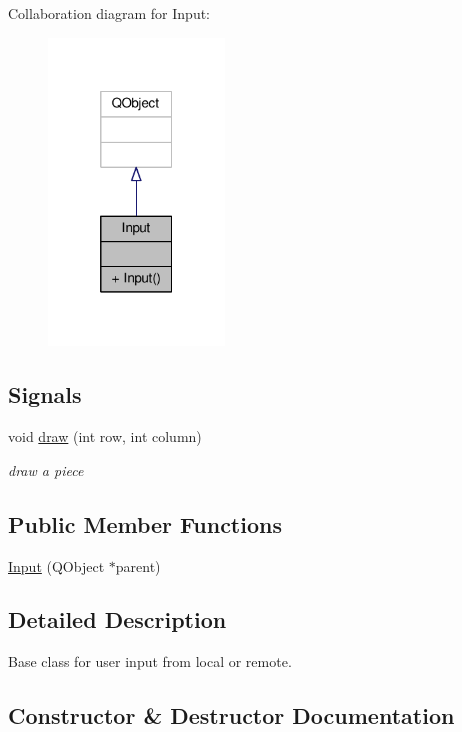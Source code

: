 Collaboration diagram for Input\+:
\nopagebreak
\begin{figure}[H]
\begin{center}
\leavevmode
\includegraphics[width=133pt]{classInput__coll__graph}
\end{center}
\end{figure}
\subsection*{Signals}
\begin{DoxyCompactItemize}
\item 
void \hyperlink{classInput_a4871f3d5d214bf0bd39ce4b336b70d63}{draw} (int row, int column)
\begin{DoxyCompactList}\small\item\em draw a piece \end{DoxyCompactList}\end{DoxyCompactItemize}
\subsection*{Public Member Functions}
\begin{DoxyCompactItemize}
\item 
\hyperlink{classInput_a1e62cdfd419302414d2bf5de1d5fd1a7}{Input} (Q\+Object $\ast$parent)
\end{DoxyCompactItemize}


\subsection{Detailed Description}
Base class for user input from local or remote. 

\subsection{Constructor \& Destructor Documentation}
